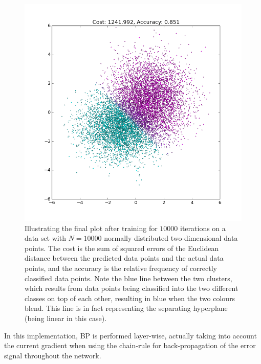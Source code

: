 \begin{figure}
\centering
\includegraphics[width=12cm]{fig/MLP_cluster_N_10000_1kiter}
\caption{Illustrating the final plot after training for $10 000$ iterations on a data set with $N=10 000$ normally distributed two-dimensional data points. The cost is the sum of squared errors of the Euclidean distance between the predicted data points and the actual data points, and the accuracy is the relative frequency of correctly classified data points. Note the blue line between the two clusters, which results from data points being classified into the two different classes on top of each other, resulting in blue when the two colours blend. This line is in fact representing the separating hyperplane (being linear in this case).}
\label{fig:theano_mlp_demo}
\end{figure}

In this implementation, BP is performed layer-wise, actually taking into account the current gradient when using the chain-rule for back-propagation of the error signal throughout the network.

\cleardoublepage